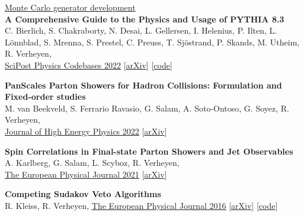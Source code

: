 \documentclass[a4paper,12pt]{article}
\begin{document}
\underline{\large{Monte Carlo generator development}} \\[5pt]
\textbf{A Comprehensive Guide to the Physics and Usage of PYTHIA 8.3} \\
C. Bierlich, S. Chakraborty, N. Desai, L. Gellersen, I. Helenius, P. Ilten, L. Lönnblad, S. Mrenna, S. Prestel, C. Preuss, T. Sjöstrand, P. Skands, M. Utheim, R. Verheyen, \\
\href{https://scipost.org/SciPostPhysCodeb.8-r8.3}{\underline{SciPost Physics Codebases 2022}} [\href{https://arxiv.org/abs/2203.11601}{arXiv}] [\href{https://pythia.org}{code}]

\textbf{PanScales Parton Showers for Hadron Collisions: Formulation and Fixed-order studies} \\
M. van Beekveld, S. Ferrario Ravasio, G. Salam, A. Soto-Ontoso, G. Soyez, R. Verheyen, \\
\href{https://link.springer.com/article/10.1007/JHEP11(2022)019https://arxiv.org/abs/2205.02237}{\underline{Journal of High Energy Physics 2022}} [\href{https://arxiv.org/abs/2205.02237}{arXiv}]

\textbf{Spin Correlations in Final-state Parton Showers and Jet Observables} \\
A. Karlberg, G. Salam, L. Scyboz, R. Verheyen, \\
\href{https://link.springer.com/article/10.1140/epjc/s10052-021-09378-0}{\underline{The European Physical Journal 2021}} [\href{https://arxiv.org/pdf/2103.16526.pdf}{arXiv}]

\textbf{Competing Sudakov Veto Algorithms} \\
R. Kleiss, R. Verheyen,
\href{https://link.springer.com/article/10.1140/epjc/s10052-016-4231-5}{\underline{The European Physical Journal 2016}} [\href{https://arxiv.org/pdf/1605.09246.pdf}{arXiv}] [\href{https://github.com/rbvh/Veto-Algorithm-Toy-Shower}{code}]



\end{document}
